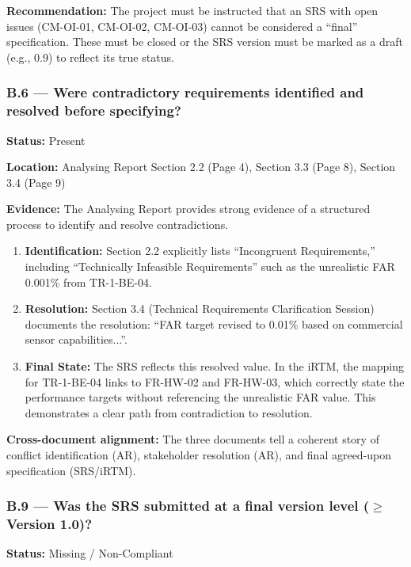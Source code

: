 \documentclass[11pt,a4paper]{article}
\begin{document}
\textbf{Recommendation:} The project must be instructed that an SRS with open issues (CM-OI-01, CM-OI-02, CM-OI-03) cannot be considered a ``final'' specification. These must be closed or the SRS version must be marked as a draft (e.g., 0.9) to reflect its true status.

\subsubsection*{B.6 --- Were contradictory requirements identified and resolved before specifying?}

\textbf{Status:} Present

\textbf{Location:} Analysing Report Section 2.2 (Page 4), Section 3.3 (Page 8), Section 3.4 (Page 9)

\textbf{Evidence:} The Analysing Report provides strong evidence of a structured process to identify and resolve contradictions.

\begin{enumerate}
\item \textbf{Identification:} Section 2.2 explicitly lists ``Incongruent Requirements,'' including ``Technically Infeasible Requirements'' such as the unrealistic FAR 0.001\% from TR-1-BE-04.

\item \textbf{Resolution:} Section 3.4 (Technical Requirements Clarification Session) documents the resolution: ``FAR target revised to 0.01\% based on commercial sensor capabilities...''.

\item \textbf{Final State:} The SRS reflects this resolved value. In the iRTM, the mapping for TR-1-BE-04 links to FR-HW-02 and FR-HW-03, which correctly state the performance targets without referencing the unrealistic FAR value. This demonstrates a clear path from contradiction to resolution.
\end{enumerate}

\textbf{Cross-document alignment:} The three documents tell a coherent story of conflict identification (AR), stakeholder resolution (AR), and final agreed-upon specification (SRS/iRTM).

\subsubsection*{B.9 --- Was the SRS submitted at a final version level ($\geq$ Version 1.0)?}

\textbf{Status:} Missing / Non-Compliant
\end{document}

